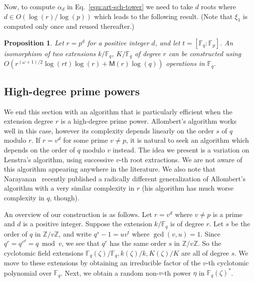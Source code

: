 \documentclass{mcom-l}
\theoremstyle{plain}
\newtheorem{proposition}[theorem]{Proposition}
\theoremstyle{definition}
\newcommand{\Z}{\ensuremath{\mathbb{Z}}}
\newcommand{\F}{\ensuremath{\mathbb{F}}}
\newcommand{\MM}{\ensuremath{\mathsf{M}}}
\newcounter{algorithm}
\begin{document}
Now, to compute $\alpha_d$ in Eq.~\eqref{equ:art-sch-tower} we 
need to take $d$ roots where $d \in O(\log(r) / \log(p))$ which leads to the following result. (Note that $\xi_1$ is computed only once and reused thereafter.)

\begin{proposition}
	Let $r = p^d$ for a positive integer $d$, and let $t = [\F_q : \F_p]$. An isomorphism of two 
	extensions $k / \F_q$, $K / \F_q$ of degree $r$ can be constructed using 
	$O(r^{(\omega+1)/2}\log(rt)\log(r) + \MM(r)\log(q))$ operations in $\F_q$.
\end{proposition}


\subsection{High-degree prime powers}
\label{sec:fast-algor-large}

We end this section with an algorithm that is particularly efficient when the extension 
degree $r$ is a high-degree prime power.
Allombert's algorithm works well in this case, however its
complexity depends linearly on the order $s$ of $q$ modulo $r$. If $r=v^d$ for some prime $v\ne p$,
it is natural to seek an algorithm which depends on the order of $q$ modulo $v$ instead.
The idea we present is a variation on Lenstra's algorithm, using successive $v$-th root
extractions.
We are not aware of this algorithm appearing anywhere in the literature. %
We also note that Narayanan~\cite[Sec.~5]{narayanan2016fast} recently
published a radically different generalization
of Allombert's algorithm with a very similar complexity in $r$ (his
algorithm has much worse complexity in $q$, though).

An overview of our construction is as follows. Let $r = v^d$ where $v \ne p$ is a 
prime and $d$ is a positive integer. Suppose the extension $k/\F_q$ is of degree $r$. Let $s$ be 
the order of $q$ in $\Z / v\Z$, and write $q^s - 1 = uv^t$ where $\gcd(v, u) = 1$. Since $q^r = 
q^{v^d} = q \bmod v$, we see that $q^r$ has the same order $s$ in $\Z / v\Z$. So the cyclotomic 
field extensions $\F_q(\zeta) / \F_q, k(\zeta) / k, K(\zeta) / K$ are all of degree $s$. We move to 
these extensions by obtaining an irreducible factor of the $v$-th cyclotomic polynomial over 
$\F_q$. Next, we obtain a random non-$v$-th power $\eta$ in $\F_q(\zeta)^*$.
\end{document}

